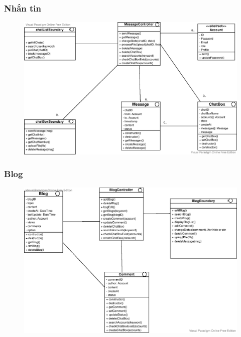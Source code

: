 \documentclass[./../main_file.tex]{subfiles}
\begin{document}
	\subsubsection{Nhắn tin}
	\begin{figure}[H]
		\centering
		\includegraphics[width=\linewidth]{./images/VOPCs/3_3_1_MessageVOPC.eps}
	\end{figure}
	\subsubsection{Blog}
	\begin{figure}[H]
		\centering
		\includegraphics[width=\linewidth]{./images/VOPCs/3_3_2_BlogVOPC.eps}
	\end{figure}
	
\end{document}
